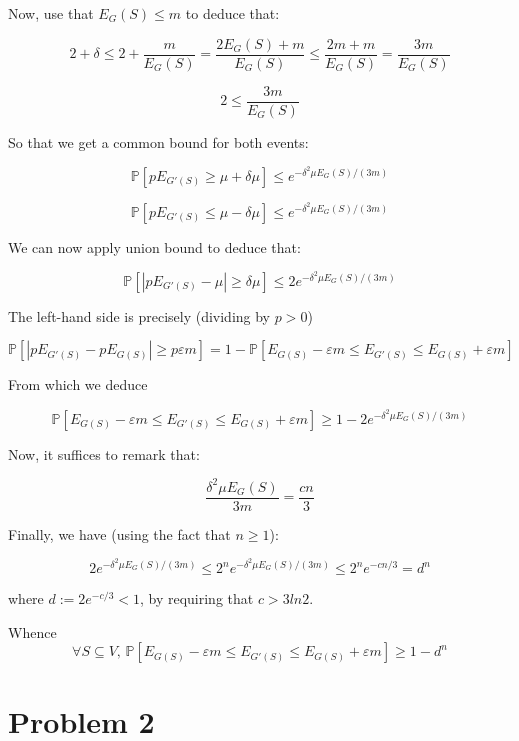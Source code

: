 \documentclass[a4paper, 11pt]{article}
\begin{document}
Now, use that $E_G(S) \le m$ to deduce that:

$$2 + \delta \le 2 + \frac{m}{E_G(S)} = \frac{2 E_G(S) + m}{E_G(S)} \le \frac{2m + m}{E_G(S)} = \frac{3m}{E_G(S)}$$

$$2 \le \frac{3m}{E_G(S)}$$

So that we get a common bound for both events:

$$\mathbb{P}\left[p E_{G'(S)} \ge \mu + \delta \mu\right] \le e^{-\delta^2\mu E_G(S)/(3m)}$$

$$\mathbb{P}\left[p E_{G'(S)} \le \mu - \delta \mu\right] \le e^{-\delta^2\mu E_G(S)/(3m)}$$

We can now apply union bound to deduce that:

$$\mathbb{P}\left[|p E_{G'(S)} - \mu| \ge \delta \mu\right] \le 2 e^{-\delta^2\mu E_G(S)/(3m)}$$

The left-hand side is precisely (dividing by $p >0$)

$$\mathbb{P}\left[|p E_{G'(S)} - p E_{G(S)}| \ge p \varepsilon m\right] = 1 - \mathbb{P}\left[E_{G(S)} - \varepsilon m \le E_{G'(S)} \le E_{G(S)} + \varepsilon m\right]$$

From which we deduce

$$\mathbb{P}\left[E_{G(S)} - \varepsilon m \le E_{G'(S)} \le E_{G(S)} + \varepsilon m\right] \ge 1 - 2e^{-\delta^2\mu E_G(S)/(3m)}$$

Now, it suffices to remark that:

$$\frac{\delta^2\mu E_G(S)}{3m} = \frac{cn}{3}$$

Finally, we have (using the fact that $n \ge 1$):

$$2e^{-\delta^2\mu E_G(S)/(3m)} \le 2^n e^{-\delta^2\mu E_G(S)/(3m)} \le 2^n e^{-cn/3} = d^n $$

where $d := 2e^{- c/3} < 1$, by requiring that $c > 3ln2$.

Whence $$\boxed{\forall S \subseteq V,\, \mathbb{P}\left[E_{G(S)} - \varepsilon m \le E_{G'(S)} \le E_{G(S)} + \varepsilon m\right] \ge 1-d^n}$$

\newpage

\section*{Problem 2}
\end{document}
